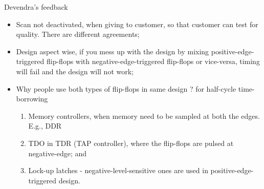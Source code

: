 \begin{frame}{Devendra's feedback}
\begin{itemize}
\item Scan not deactivated, when giving to customer, so that customer can test for quality. There are different agreements; 
\item Design aspect wise, if you mess up with the design by mixing positive-edge-triggered flip-flops with negative-edge-triggered flip-flops or vice-versa, timing will fail and the design will not work; 
\item Why people use both types of flip-flops in same design ? for half-cycle time-borrowing
	\begin{enumerate}
	\item Memory controllers, when memory need to be sampled at both the edges. E.g., DDR
	\item TDO in TDR (TAP controller), where the flip-flops are pulsed at negative-edge; and 
	\item Lock-up latches - negative-level-sensitive ones are used in positive-edge-triggered design.
	\end{enumerate}
\end{itemize}
\end{frame}

